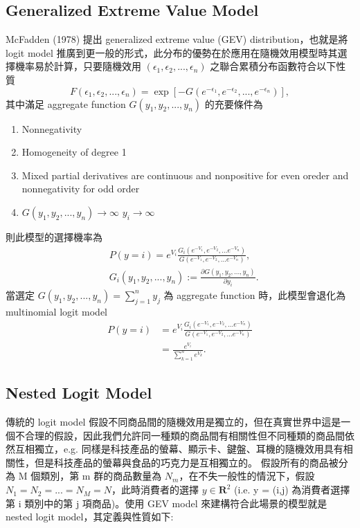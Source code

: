 \documentclass[12pt]{article}
\theoremstyle{definition}
\begin{document}
\subsection{Generalized Extreme Value Model}
McFadden (1978) 提出 generalized extreme value (GEV) distribution，也就是將 logit model 推廣到更一般的形式，此分布的優勢在於應用在隨機效用模型時其選擇機率易於計算，只要隨機效用 $(\epsilon_{1}, \epsilon_{2}, ..., \epsilon_{n})$ 之聯合累積分布函數符合以下性質
\begin{equation}
    F(\epsilon_{1}, \epsilon_{2}, ..., \epsilon_{n}) = \exp[-G(e^{-\epsilon_{1}}, e^{-\epsilon_{2}}, ..., e^{-\epsilon_{n}})],
\end{equation}
其中滿足 aggregate function $G(y_1, y_2, ..., y_n)$ 的充要條件為
\begin{enumerate}
    \item Nonnegativity
    \item Homogeneity of degree 1
    \item Mixed partial derivatives are continuous and nonpositive for even oreder and nonnegativity for odd order
    \item  $G(y_1, y_2, ..., y_n) \rightarrow \infty$  $y_i \rightarrow \infty$
\end{enumerate}
則此模型的選擇機率為
\begin{align}\label{eqn:the property of GEV model}
    &P(y=i) = e^{V_{i}}\frac{G_i(e^{-V_1},e^{-V_2},...e^{-V_n})}{G(e^{-V_1},e^{-V_2},...e^{-V_n})},\\
    &G_i(y_1, y_2, ..., y_n) := \frac{\partial G(y_1, y_2, ..., y_n)}{\partial y_i}. \nonumber
\end{align}
當選定 $G(y_1, y_2, ..., y_n)=\sum_{j=1}^{n} y_j$ 為 aggregate function 時，此模型會退化為 multinomial logit model
\begin{align*}
    P(y=i) &= e^{V_{i}}\frac{G_i(e^{-V_1},e^{-V_2},...e^{-V_n})}{G(e^{-V_1},e^{-V_2},...e^{-V_n})}\\
    &= \frac{e^{V_{i}}}{\sum_{k=1}^{n} e^{V_{k}}}.
\end{align*}
\subsection{Nested Logit Model}
傳統的 logit model 假設不同商品間的隨機效用是獨立的，但在真實世界中這是一個不合理的假設，因此我們允許同一種類的商品間有相關性但不同種類的商品間依然互相獨立，e.g. 同樣是科技產品的螢幕、顯示卡、鍵盤、耳機的隨機效用具有相關性，但是科技產品的螢幕與食品的巧克力是互相獨立的。\newline
\indent 假設所有的商品被分為 M 個類別，第 m 群的商品數量為 $N_m$，在不失一般性的情況下，假設 $N_1 = N_2 = ... = N_M = N$，此時消費者的選擇 $y \in \textbf{R}^2$ (i.e. y = (i,j) 為消費者選擇第 i 類別中的第 j 項商品)。使用 GEV model 來建構符合此場景的模型就是 nested logit model，其定義與性質如下:
\end{document}
